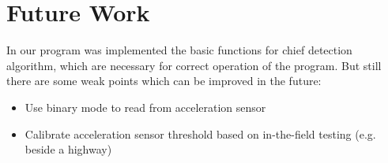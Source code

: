\chapter{Future Work}
In our program was implemented the basic functions for chief detection algorithm, which are necessary for correct operation of the program. But still there are some weak points which can be improved in the future: 
\begin{itemize}
	\item Use binary mode to read from acceleration sensor
	\item Calibrate acceleration sensor threshold based on in-the-field testing (e.g. beside a highway)
\end{itemize}

\clearpage